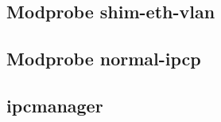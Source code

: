 \subsection{Modprobe shim-eth-vlan}



\subsection{Modprobe normal-ipcp}



\subsection{ipcmanager}

